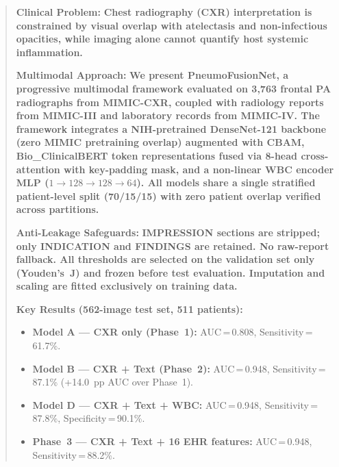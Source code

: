\documentclass[conference]{IEEEtran}
\begin{document}
\begin{abstract}
\begin{tcolorbox}[
  colback=aisoft!70,
  colframe=aideep,
  arc=3pt,
  boxrule=0.8pt,
  left=5pt,right=5pt,top=5pt,bottom=5pt
]
\noindent\textbf{\textcolor{aideep}{Clinical Problem:}} \textbf{Chest radiography (CXR) interpretation is constrained by visual overlap with atelectasis and non-infectious opacities, while imaging alone cannot quantify host systemic inflammation.}

\vspace{3pt}
\noindent\textbf{\textcolor{aideep}{Multimodal Approach:}} \textbf{We present PneumoFusionNet, a progressive multimodal framework evaluated on 3{,}763 frontal PA radiographs from MIMIC-CXR, coupled with radiology reports from MIMIC-III and laboratory records from MIMIC-IV. The framework integrates a NIH-pretrained DenseNet-121 backbone (zero MIMIC pretraining overlap) augmented with CBAM, Bio\_ClinicalBERT token representations fused via 8-head cross-attention with key-padding mask, and a non-linear WBC encoder MLP ($1 \to 128 \to 128 \to 64$). All models share a single stratified patient-level split (70/15/15) with zero patient overlap verified across partitions.}

\vspace{3pt}
\noindent\textbf{\textcolor{aideep}{Anti-Leakage Safeguards:}} \textbf{IMPRESSION sections are stripped; only INDICATION and FINDINGS are retained. No raw-report fallback. All thresholds are selected on the validation set only (Youden's~J) and frozen before test evaluation. Imputation and scaling are fitted exclusively on training data.}

\vspace{3pt}
\noindent\textbf{\textcolor{aideep}{Key Results (562-image test set, 511 patients):}}
\begin{itemize}[noitemsep,topsep=1pt,leftmargin=*]
  \item \textbf{Model A — CXR only (Phase~1):} AUC\,=\,0.808, Sensitivity\,=\,61.7\%.
  \item \textbf{Model B — CXR + Text (Phase~2):} AUC\,=\,0.948, Sensitivity\,=\,87.1\% (+14.0~pp AUC over Phase~1).
  \item \textbf{Model D — CXR + Text + WBC:} AUC\,=\,0.948, Sensitivity\,=\,87.8\%, Specificity\,=\,90.1\%.
  \item \textbf{Phase~3 — CXR + Text + 16 EHR features:} AUC\,=\,0.948, Sensitivity\,=\,88.2\%.
\end{itemize}
\end{tcolorbox}
\end{abstract}
\end{document}
